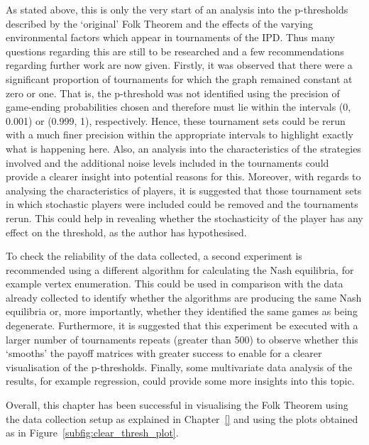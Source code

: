 As stated above, this is only the very start of an analysis into the
p-thresholds described by the `original' Folk Theorem and the effects of the
varying environmental factors which appear in tournaments of the IPD. Thus many
questions regarding this are still to be researched and a few recommendations
regarding further work are now given. Firstly, it was observed that there were a
significant proportion of tournaments for which the graph remained constant at
zero or one. That is, the p-threshold was not identified using the precision of
game-ending probabilities chosen and therefore must lie within the intervals (0,
0.001) or (0.999, 1), respectively. Hence, these tournament sets could be rerun
with a much finer precision within the appropriate intervals to highlight
exactly what is happening here. Also, an analysis into the characteristics of
the strategies involved and the additional noise levels included in the
tournaments could provide a clearer insight into potential reasons for this.
Moreover, with regards to analysing the characteristics of players, it is
suggested that those tournament sets in which stochastic players were included
could be removed and the tournaments rerun. This could help in revealing whether
the stochasticity of the player has any effect on the threshold, as the author
has hypothesised. 

To check the reliability of the data collected, a second
experiment is recommended using a different algorithm for calculating the Nash
equilibria, for example vertex enumeration. This could be used in comparison
with the data already collected to identify whether the algorithms are producing
the same Nash equilibria or, more importantly, whether they identified the same
games as being degenerate. Furthermore, it is suggested that this experiment be
executed with a larger number of tournaments repeats (greater than 500) to
observe whether this `smooths' the payoff matrices with greater success to
enable for a clearer visualisation of the p-thresholds. Finally, some
multivariate data analysis of the results, for example regression, could provide
some more insights into this topic.

Overall, this chapter has been successful in visualising the Folk Theorem using
the data collection setup as explained in Chapter~\ref{} and using the plots
obtained as in Figure~\ref{subfig:clear_thresh_plot}.